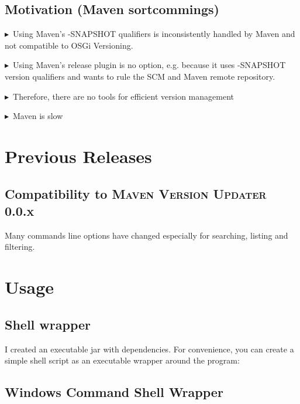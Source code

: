 \documentclass[a4paper,11pt,english,oneside,halfparskip]{scrartcl}
\newcommand{\MVU}{\textsc{\small{}Maven Version Updater}}
\newcommand{\G}{\par\noindent\ensuremath{\blacktriangleright}~}
\newcommand{\code}[1]{\texttt{#1}}
\begin{document}
\subsection{Motivation (Maven sortcommings)}
\G Using Maven's -SNAPSHOT qualifiers is inconsistently handled by Maven and not compatible to OSGi Versioning.
\G Using Maven's release plugin is no option, e.g. because it uses -SNAPSHOT version qualifiers and wants to rule the SCM and Maven remote repository.
\G Therefore, there are no tools for efficient version management
\G Maven is slow

\section{Previous Releases} 

\subsection{Compatibility to \MVU{} 0.0.x}

Many commands line options have changed especially for searching, listing and filtering.

\section{Usage}

\subsection{Shell wrapper}

I created an executable jar with dependencies. For convenience, you can create a simple shell script as an executable wrapper around the program:


\subsection{Windows Command Shell Wrapper}
\end{document}
